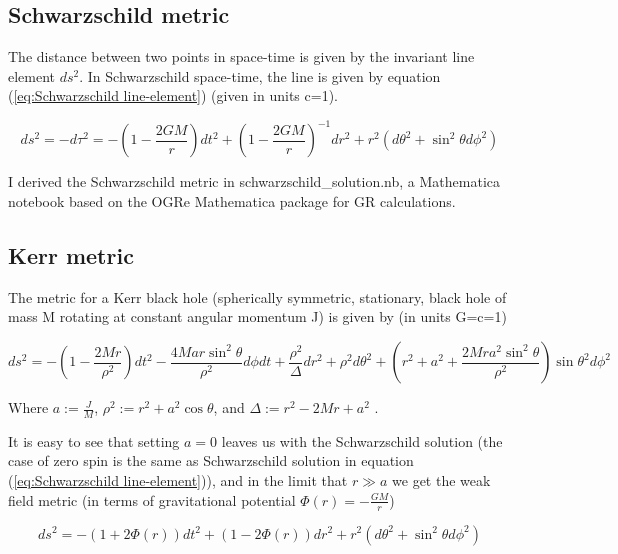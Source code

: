 \subsection{Schwarzschild metric}

The distance between two points in space-time is given by the invariant line element $ds^2$. In Schwarzschild space-time, the line is given by equation (\ref{eq:Schwarzschild line-element}) (given in units c=1).

\begin{equation}
    ds^2 = - d\tau^2 = - (1-\frac{2 G M}{r}) dt^2 +  (1-\frac{2 G M}{r})^{-1} dr^2
            + r^2 (d\theta^2+\sin^2\theta d\phi^2)
\label{eq:Schwarzschild line-element}
\end{equation}

I derived the Schwarzschild metric in schwarzschild\_solution.nb, a Mathematica notebook based on the OGRe Mathematica package \cite{Shoshany2021_OGRe} for GR calculations.

\subsection{Kerr metric}

The metric for a Kerr black hole (spherically symmetric, stationary, black hole of mass M rotating at constant angular momentum J) is given by (in units G=c=1)

\begin{equation}\label{eq:Kerr metric}
    ds^2 = -\left(1-\frac{2Mr}{\rho^2}\right) dt^2-\frac{4Mar \sin^2{\theta}}{\rho^2} d\phi dt+ \frac{\rho^2}{\Delta} dr^2 + \rho^2 d\theta^2 +\left(r^2+a^2+
    \frac{2Mra^2\sin^2{\theta}}{\rho^2}
    \right)\sin{\theta}^2 d\phi^2
\end{equation}

Where $a:=\frac{J}{M}$, $\rho^2:=r^2+a^2 \cos{\theta}$, and $\Delta:=r^2-2Mr+a^2$ \cite{carroll2019spacetime}.

It is easy to see that setting $a=0$ leaves us with the Schwarzschild solution (the case of zero spin is the same as Schwarzschild solution in equation (\ref{eq:Schwarzschild line-element})), and in the limit that $r \gg a$ we get the weak field metric (in terms of gravitational potential $\Phi(r)=-\frac{G M}{r}$)

\begin{equation}
    ds^2 = - (1+2\Phi(r)) dt^2 +  (1-2\Phi(r)) dr^2
            + r^2 (d\theta^2+\sin^2\theta d\phi^2)
\label{eq:Weak field metric}
\end{equation}

